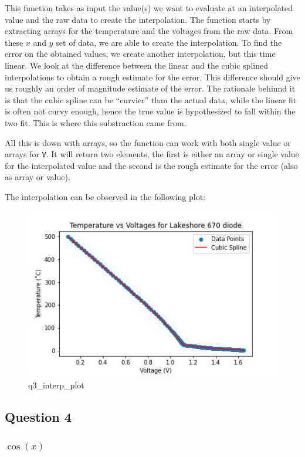 \documentclass[
]{article}
\begin{document}
This function takes as input the value(s) we want to evaluate at an
interpolated value and the raw data to create the interpolation. The
function starts by extracting arrays for the temperature and the
voltages from the raw data. From these \(x\) and \(y\) set of data, we
are able to create the interpolation. To find the error on the obtained
values, we create another interpolation, but this time linear. We look
at the difference between the linear and the cubic splined
interpolations to obtain a rough estimate for the error. This difference
should give us roughly an order of magnitude estimate of the error. The
rationale behinnd it is that the cubic spline can be ``curvier'' than
the actual data, while the linear fit is often not curvy enough, hence
the true value is hypothesized to fall within the two fit. This is where
this substraction came from.

All this is down with arrays, so the function can work with both single
value or arrays for \texttt{V}. It will return two elements, the first
is either an array or single value for the interpolated value and the
second is the rough estimate for the error (also as array or value).

The interpolation can be observed in the following plot:

\begin{figure}
\centering
\includegraphics{figs/q3_interp_plot.jpg}
\caption{q3\_interp\_plot}
\end{figure}

\hypertarget{question-4}{%
\subsection{Question 4}\label{question-4}}

\hypertarget{cos-x}{%
\subsubsection{\texorpdfstring{\(\cos (x)\)}{\textbackslash cos (x)}}\label{cos-x}}
\end{document}
